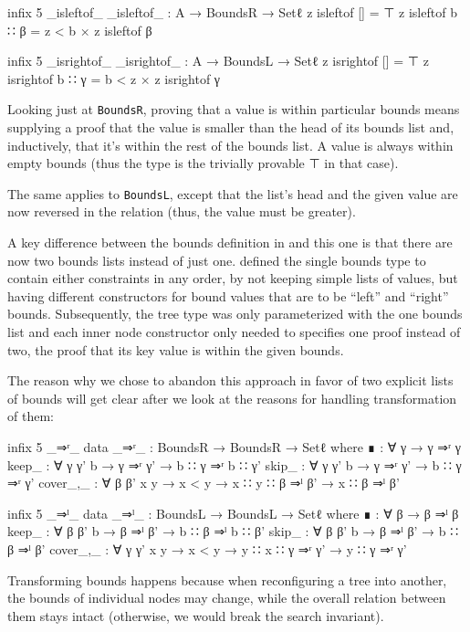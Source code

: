 \documentclass{scrartcl}
\newenvironment{code}{\verbatim}{\endverbatim}
\begin{document}
\begin{code}
infix 5 _isleftof_
_isleftof_ : A → BoundsR → Setℓ
z isleftof []     = ⊤
z isleftof b ∷ β  = z < b × z isleftof β

infix 5 _isrightof_
_isrightof_ : A → BoundsL → Setℓ
z isrightof []     = ⊤
z isrightof b ∷ γ  = b < z × z isrightof γ
\end{code}

Looking just at \verb/BoundsR/, proving that a value is within
particular bounds means supplying a proof that the value is smaller
than the head of its bounds list and, inductively, that it's within the
rest of the bounds list. A value is always within empty bounds (thus
the type is the trivially provable ⊤ in that case).

The same applies to \verb/BoundsL/, except that the list's head and
the given value are now reversed in the relation (thus, the value must
be greater).

A key difference between the bounds definition in \cite{eha2009} and
this one is that there are now two bounds lists instead of just
one. \cite{eha2009} defined the single bounds type to contain either
constraints in any order, by not keeping simple lists of values, but
having different constructors for bound values that are to be ``left''
and ``right'' bounds. Subsequently, the tree type was only
parameterized with the one bounds list and each inner node constructor
only needed to specifies one proof instead of two, the proof that its key
value is within the given bounds.

The reason why we chose to abandon this approach in favor of two
explicit lists of bounds will get clear after we look at the
reasons for handling transformation of them:

\begin{code}
infix 5 _⇒ʳ_
data _⇒ʳ_ : BoundsR → BoundsR → Setℓ where
  ∎      : ∀ {γ} → γ ⇒ʳ γ
  keep_  : ∀ {γ γ' b} → γ ⇒ʳ γ' → b ∷ γ ⇒ʳ b ∷ γ'
  skip_  : ∀ {γ γ' b} → γ ⇒ʳ γ' → b ∷ γ ⇒ʳ γ'
  cover_,_  : ∀ {β β' x y} → x < y → x ∷ y ∷ β ⇒ˡ β'
         → x ∷ β ⇒ˡ β'

infix 5 _⇒ˡ_
data _⇒ˡ_ : BoundsL → BoundsL → Setℓ where
  ∎      : ∀ {β} → β ⇒ˡ β
  keep_  : ∀ {β β' b} → β ⇒ˡ β' → b ∷ β ⇒ˡ b ∷ β'
  skip_  : ∀ {β β' b} → β ⇒ˡ β' → b ∷ β ⇒ˡ β'
  cover_,_  : ∀ {γ γ' x y} → x < y → y ∷ x ∷ γ ⇒ʳ γ'
         → y ∷ γ ⇒ʳ γ'

\end{code}

Transforming bounds happens because when reconfiguring a tree into
another, the bounds of individual nodes may change, while the overall
relation between them stays intact (otherwise, we would break the
search invariant).
\end{document}
